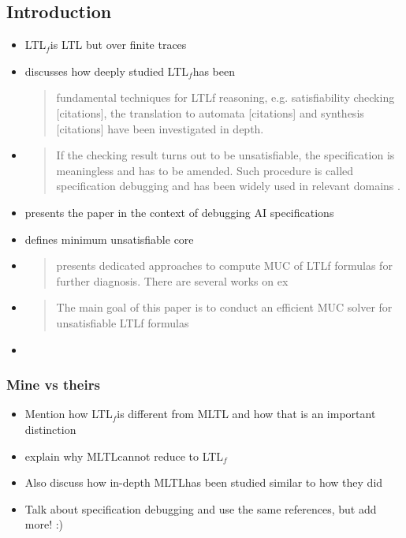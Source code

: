 \documentclass{article}
\newcommand\ltlf{{LTL}$_f$}
\newcommand\mltl{{MLTL}}
\begin{document}
\subsection*{Introduction}
\begin{itemize}
    \item \ltlf is LTL but over finite traces
    \item discusses how deeply studied \ltlf has been 
            \begin{quote}
                fundamental techniques for LTLf reasoning, e.g. satisfiability checking [citations], the translation to automata [citations] and synthesis [citations] have been investigated in depth.
            \end{quote}
    \item \begin{quote}
        If the checking result turns out to be unsatisfiable, the specification is meaningless and has to be amended. Such procedure is called specification debugging and has been widely used in relevant domains \cite{shlyakhter2003debugging,standards2016ieee,luo2021identify}.
    \end{quote}
    \item presents the paper in the context of debugging AI specifications
    \item defines minimum unsatisfiable core
    \item \begin{quote}
        presents dedicated approaches to compute MUC of LTLf formulas for further diagnosis. There are several works on ex
    \end{quote}
    \item \begin{quote}
        The main goal of this paper is to conduct an efficient MUC solver for unsatisfiable LTLf formulas
    \end{quote}
    \item 
\end{itemize}


\subsubsection*{Mine vs theirs}
\begin{itemize}
    \item Mention how \ltlf is different from MLTL and how that is an important distinction
    \item explain why \mltl cannot reduce to \ltlf
    \item Also discuss how in-depth \mltl has been studied similar to how they did 
    \item Talk about specification debugging and use the same references, but add more! :)
\end{itemize}
\end{document}
